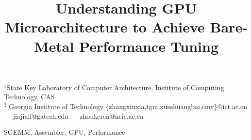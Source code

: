 \documentclass[10pt, numbers]{sigplanconf}
\begin{document}






\title{Understanding GPU Microarchitecture to Achieve Bare-Metal Performance Tuning}
\subtitle{}


           {$^1$State Key Laboratory of Computer Architecture, Institute of Computing Technology, CAS  \\ $^2$ Georgia Institute of Technology}
           {\{zhangxiuxia,tgm,xueshuangbai,cmy\}@ict.ac.cn ~~ jiajiali@gatech.edu ~~ zhoukeren@ncic.ac.cn}

\maketitle




\keywords
SGEMM, Assembler, GPU, Performance








%
%





%
\end{document}
